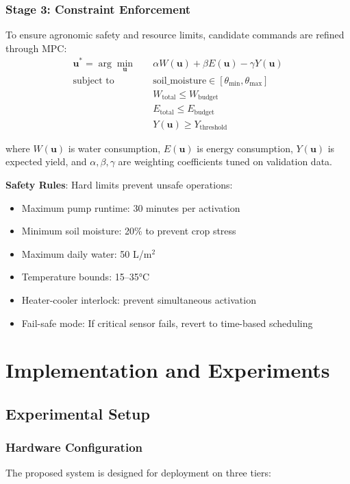 \documentclass[conference]{IEEEtran}
\begin{document}
\subsubsection{Stage 3: Constraint Enforcement}
To ensure agronomic safety and resource limits, candidate commands are refined through MPC:
\begin{equation}
\begin{aligned}
\mathbf{u}^* = \arg\min_{\mathbf{u}} \quad & \alpha W(\mathbf{u}) + \beta E(\mathbf{u}) - \gamma Y(\mathbf{u}) \\
\text{subject to} \quad & \text{soil\_moisture} \in [\theta_{\min}, \theta_{\max}] \\
& W_{\text{total}} \leq W_{\text{budget}} \\
& E_{\text{total}} \leq E_{\text{budget}} \\
& Y(\mathbf{u}) \geq Y_{\text{threshold}}
\end{aligned}
\end{equation}

where $W(\mathbf{u})$ is water consumption, $E(\mathbf{u})$ is energy consumption, $Y(\mathbf{u})$ is expected yield, and $\alpha, \beta, \gamma$ are weighting coefficients tuned on validation data.

\textbf{Safety Rules}: Hard limits prevent unsafe operations:
\begin{itemize}
\item Maximum pump runtime: 30 minutes per activation
\item Minimum soil moisture: 20\% to prevent crop stress
\item Maximum daily water: 50 L/m$^2$
\item Temperature bounds: 15--35°C
\item Heater-cooler interlock: prevent simultaneous activation
\item Fail-safe mode: If critical sensor fails, revert to time-based scheduling
\end{itemize}

\section{Implementation and Experiments}

\subsection{Experimental Setup}

\subsubsection{Hardware Configuration}
The proposed system is designed for deployment on three tiers:
\end{document}
